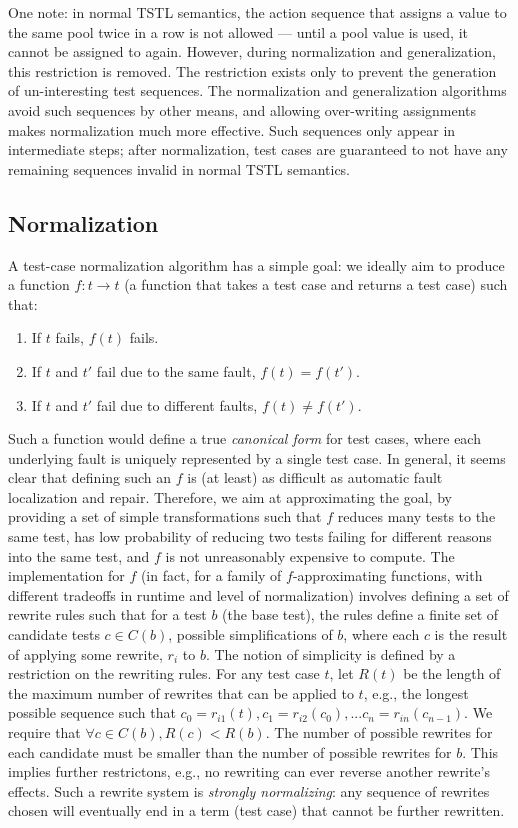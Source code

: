 One note: in normal TSTL semantics, the action sequence that assigns a
value to the same pool twice in a row is not allowed --- until a pool
value is used, it cannot be assigned to again.  However, during
normalization and generalization, this restriction is removed.  The
restriction exists only to prevent the generation of un-interesting
test sequences.  The normalization and generalization algorithms avoid
such sequences by other means, and allowing over-writing assignments
makes normalization much more effective.  Such sequences only appear
in intermediate steps; after normalization, test
cases are guaranteed to not have any remaining sequences invalid in
normal TSTL semantics.

\subsection{Normalization}

A test-case normalization algorithm has a simple goal:  we ideally aim to
produce a function $f : t \rightarrow t$ (a function that takes a test
case and returns a test case) such that:

\begin{enumerate}
\item If $t$ fails, $f(t)$ fails.
\item If $t$ and $t'$ fail due to the same fault, $f(t) = f(t')$.
\item If $t$ and $t'$ fail due to different faults, $f(t) \not=
  f(t')$.
\end{enumerate}

Such a function would define a true \emph{canonical form} for test cases, where
each underlying fault is uniquely represented by a single test case.
In general, it seems clear that defining such an $f$ is (at least) as
difficult as automatic fault localization and repair.  Therefore, we
aim at approximating the goal, by providing a set of simple
transformations such that $f$ reduces many tests to the same test, has
low probability of reducing two tests failing for different reasons
into the same test, and $f$ is not unreasonably expensive to compute.
The implementation for $f$ (in fact, for a family of $f$-approximating
functions, with different tradeoffs in runtime and level of
normalization) involves defining a set of rewrite rules such that for a
test $b$ (the base test), the rules define a finite set of candidate
tests $c \in C(b)$, possible simplifications of $b$, where each $c$ is
the result of applying some rewrite, $r_i$ to $b$.  The notion of
simplicity is defined by a restriction on the rewriting rules.  For
any test case $t$, let $R(t)$ be the length of the maximum number of
rewrites that can be applied to $t$, e.g., the longest possible
sequence such that $c_0 = r_{i1}(t), c_1 = r_{i2}(c_0), ... c_n = r_{in}(c_{n-1})$. We
require that $\forall c \in C(b), R(c) < R(b)$.  The number of possible
rewrites for each candidate must be smaller than the number of
possible rewrites for $b$.  This implies further restrictons, e.g., no
rewriting can ever reverse another rewrite's effects.  Such a rewrite
system is \emph{strongly normalizing}:  any sequence of rewrites
chosen will eventually end in a term (test case) that cannot be
further rewritten.

